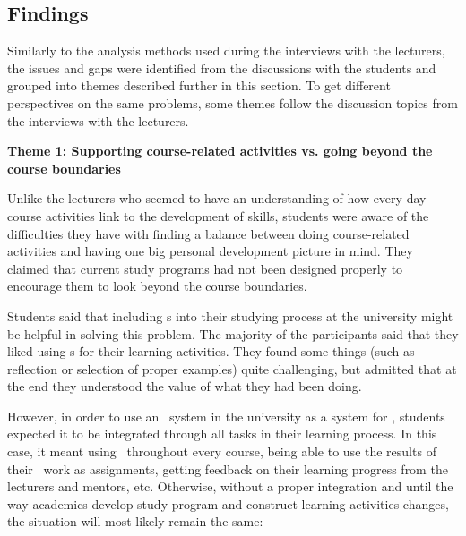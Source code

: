 \subsection{Findings}

Similarly to the analysis methods used during the interviews with the lecturers,
the issues and gaps were identified from the discussions with the students and
grouped into themes described further in this section. To get different
perspectives on the same problems, some themes follow the discussion topics from
the interviews with the lecturers.

\textbf{Theme 1: Supporting course-related activities vs. going beyond the
course boundaries}

Unlike the lecturers who seemed to have an understanding of how every day
course activities link to the development of \LLLs skills, students were aware
of the difficulties they have with finding a balance between doing
course-related activities and having one big personal development picture in
mind. They claimed that current study programs had not been designed properly to
encourage them to look beyond the course boundaries.


Students said that including \ep s into their studying process at the university
might be helpful in solving this problem. The majority of the participants said
that they liked using \ep s for their learning activities. They found some
things (such as reflection or selection of proper examples) quite challenging,
but admitted that at the end they understood the value of what they had been
doing.

However, in order to use an \ep~system in the university as a system for \LLLsn,
students expected it to be integrated through all tasks in their learning
process. In this case, it meant using \ep~throughout every course, being able to
use the results of their \ep~work as assignments, getting feedback on their
learning progress from the lecturers and mentors, etc. Otherwise, without a
proper integration and until the way academics develop study program and
construct learning activities changes, the situation will most likely remain the
same:


